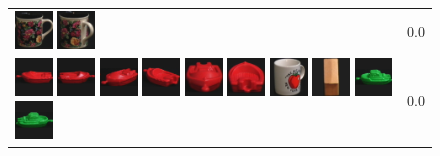\begin{figure}[tbp]
\begin{center}
\begin{tabular}{m{11cm} | m{3cm} |}
\includegraphics[width=1cm]{coil/beeld-60.eps} 
\includegraphics[width=1cm]{coil/beeld-64.eps} & {\scriptsize 0.0} \\ 
\includegraphics[width=1cm]{coil/beeld-18.eps} 
\includegraphics[width=1cm]{coil/beeld-19.eps} 
\includegraphics[width=1cm]{coil/beeld-21.eps} 
\includegraphics[width=1cm]{coil/beeld-22.eps} 
\includegraphics[width=1cm]{coil/beeld-20.eps} 
\includegraphics[width=1cm]{coil/beeld-23.eps} 
\includegraphics[width=1cm]{coil/beeld-39.eps} 
\includegraphics[width=1cm]{coil/beeld-44.eps} 
\includegraphics[width=1cm]{coil/beeld-54.eps} 
\includegraphics[width=1cm]{coil/beeld-55.eps} & {\scriptsize 0.0} \\ 

\end{tabular}
\end{center}
\end{figure}
